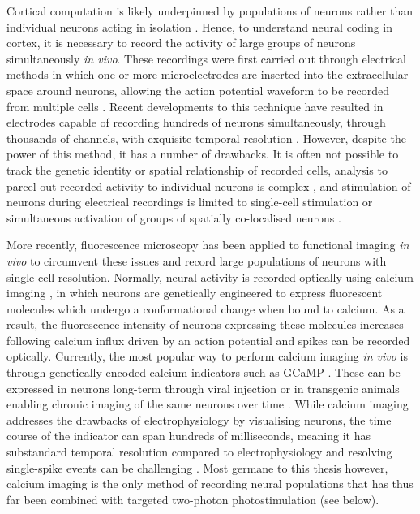 Cortical computation is likely underpinned by populations of neurons  rather than individual neurons acting in isolation \cite{averbeck_neural_2006, kohn_correlations_2016, panzeri_cracking_2017}. Hence, to understand neural coding in cortex, it is necessary to record the activity of large groups of neurons simultaneously \textit{in vivo}. These recordings were first carried out through electrical methods in which one or more microelectrodes are inserted into the extracellular space around neurons, allowing the action potential waveform to be recorded from multiple cells \cite{hubel_tungsten_1957, mcnaughton_stereotrode_1983, buzsaki_large-scale_2004}. Recent developments to this technique have resulted in electrodes capable of recording hundreds of neurons simultaneously, through thousands of channels, with exquisite temporal resolution \cite{steinmetz_neuropixels_2021}. However, despite the power of this method, it has a number of drawbacks. It is often not possible to track the genetic identity or spatial relationship of recorded cells, analysis to parcel out recorded activity to individual neurons is complex \cite{harris_improving_2016}, and stimulation of neurons during electrical recordings is limited to single-cell stimulation \cite{margrie_vivo_2002, houweling_nanostimulation_2010} or simultaneous activation of groups of spatially co-localised neurons \cite{penfield_w_somatic_1937, asanuma_functional_1967, salzman_cortical_1990, romo_somatosensory_1998, cardin_driving_2009, kim_integration_2017}.

More recently, fluorescence microscopy has been applied to functional imaging \textit{in vivo} to circumvent these issues and record large populations of neurons with single cell resolution. Normally, neural activity is recorded optically using calcium imaging \cite{grienberger_imaging_2012}, in which neurons are genetically engineered to express fluorescent molecules which undergo a conformational change when bound to calcium. As a result, the fluorescence intensity of neurons expressing these molecules increases following calcium influx driven by an action potential \cite{berridge_neuronal_1998} and spikes can be recorded optically. Currently, the most popular way to perform calcium imaging \textit{in vivo} is through genetically encoded calcium indicators \cite{looger_genetically_2012} such as GCaMP \cite{chen_ultrasensitive_2013, dana_high-performance_2019}. These can be expressed in neurons long-term through viral injection \cite{packer_simultaneous_2015} or in transgenic animals \cite{huang_relationship_2021} enabling chronic imaging of the same neurons over time \cite{andermann_chronic_2013}. While calcium imaging addresses the drawbacks of electrophysiology by visualising neurons, the time course of the indicator can span hundreds of milliseconds, meaning it has substandard temporal resolution compared to electrophysiology and resolving single-spike events can be challenging \cite{huang_relationship_2021}. Most germane to this thesis however, calcium imaging is the only method of recording neural populations that has thus far been combined with targeted two-photon photostimulation \cite{packer_simultaneous_2015} (see below).

